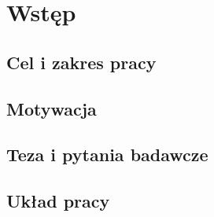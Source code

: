 \section{Wstęp}
\label{sec:introduction}


\subsection{Cel i zakres pracy}
\label{subsec:intro_scope}

\subsection{Motywacja}
\label{subsec:intro_motivation}

\subsection{Teza i pytania badawcze}
\label{subsec:intro_thesis}

\subsection{Układ pracy}
\label{subsec:intro_structure}